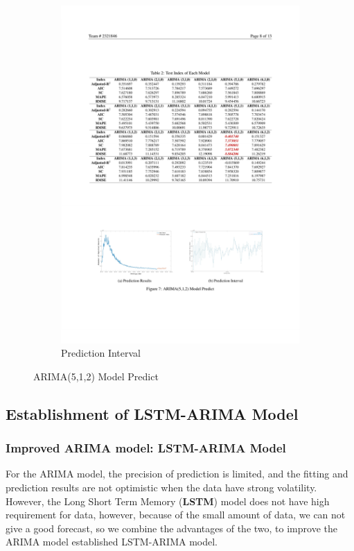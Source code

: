 \documentclass[12pt]{article}  %
\begin{document}
\begin{figure}[htbp]
\begin{subfigure}[b]{.49\textwidth}
\includegraphics[width=\textwidth]{img/wucha.pdf}\caption{Prediction Interval}
\end{subfigure}
\caption{ARIMA(5,1,2) Model Predict}
\end{figure}
\subsection{Establishment of LSTM-ARIMA Model}
\subsubsection{Improved ARIMA model: LSTM-ARIMA Model}
For the ARIMA model, the precision of prediction is limited, and the fitting and prediction results are not optimistic when the data have strong volatility. However, the Long Short Term Memory (\textbf{LSTM}) model does not have high requirement for data, however, because of the small amount of data, we can not give a good forecast, so we combine the advantages of the two, to improve the ARIMA model established LSTM-ARIMA model.
\end{document}
